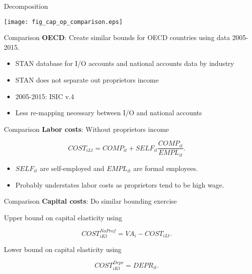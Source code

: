 \documentclass[10pt, xcolor=dvipsnames]{beamer}
\begin{document}
\begin{frame}{Decomposition}
\begin{center}
\texttt{[image: fig\_cap\_op\_comparison.eps]}
\end{center}
\end{frame}


\begin{frame}{Comparison}
\textbf{OECD}: Create similar bounds for OECD countries using data 2005-2015.

\begin{itemize}
  \item STAN database for I/O accounts and national accounts data by industry
  \item STAN does not separate out proprietors income
  \item 2005-2015: ISIC v.4
  \item Less re-mapping necessary between I/O and national accounts
\end{itemize}

\end{frame}

\begin{frame}{Comparison}
\textbf{Labor costs}: Without proprietors income

\begin{equation}
  COST_{iLt} = COMP_{it} + SELF_{it}\frac{COMP_{it}}{EMPL_{it}}.
\end{equation}

\begin{itemize}
  \item $SELF_{it}$ are self-employed and $EMPL_{it}$ are formal employees. 
  \item Probably understates labor costs as proprietors tend to be high wage.
\end{itemize}

\end{frame}

\begin{frame}{Comparison}
\textbf{Capital costs}: Do similar bounding exercise

\vspace{.25in}
Upper bound on capital elasticity using

\begin{equation}
  COST_{iKt}^{NoProf} = VA_i - COST_{iLt}.
\end{equation}

\vspace{.25in}
Lower bound on capital elasticity using

\begin{equation}
  COST_{iKt}^{Depr} = DEPR_{it}.
\end{equation}

\end{frame}
\end{document}
